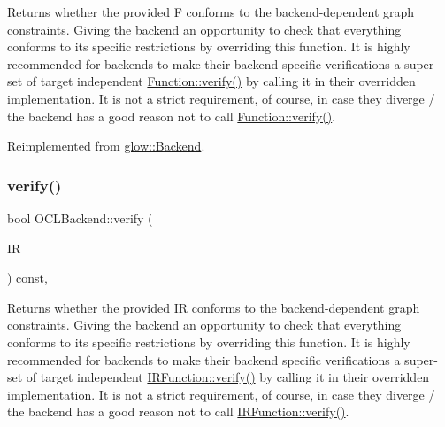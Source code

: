 \begin{DoxyReturn}{Returns}
whether the provided {\ttfamily F} conforms to the backend-\/dependent graph constraints. Giving the backend an opportunity to check that everything conforms to its specific restrictions by overriding this function. It is highly recommended for backends to make their backend specific verifications a super-\/set of target independent \hyperlink{classglow_1_1_function_a73897a61138cf69eacb41357839815df}{Function\+::verify()} by calling it in their overridden implementation. It is not a strict requirement, of course, in case they diverge / the backend has a good reason not to call \hyperlink{classglow_1_1_function_a73897a61138cf69eacb41357839815df}{Function\+::verify()}. 
\end{DoxyReturn}


Reimplemented from \hyperlink{classglow_1_1_backend_a868ff3dc24281eba5900c3ad84baef1b}{glow\+::\+Backend}.

\mbox{\label{classglow_1_1_o_c_l_backend_aa8e73591e3340113c10d5c5c86ccb642}} 
\subsubsection{\texorpdfstring{verify()}{verify()}\hspace{0.1cm}{\footnotesize\ttfamily [2/2]}}
{\footnotesize\ttfamily bool O\+C\+L\+Backend\+::verify (\begin{DoxyParamCaption}\item[{const \hyperlink{classglow_1_1_i_r_function}{I\+R\+Function} \&}]{IR }\end{DoxyParamCaption}) const\hspace{0.3cm}{\ttfamily [override]}, {\ttfamily [virtual]}}

\begin{DoxyReturn}{Returns}
whether the provided {\ttfamily IR} conforms to the backend-\/dependent graph constraints. Giving the backend an opportunity to check that everything conforms to its specific restrictions by overriding this function. It is highly recommended for backends to make their backend specific verifications a super-\/set of target independent \hyperlink{classglow_1_1_i_r_function_a3add272c76243daef4950bf3ff68338c}{I\+R\+Function\+::verify()} by calling it in their overridden implementation. It is not a strict requirement, of course, in case they diverge / the backend has a good reason not to call \hyperlink{classglow_1_1_i_r_function_a3add272c76243daef4950bf3ff68338c}{I\+R\+Function\+::verify()}. 
\end{DoxyReturn}


